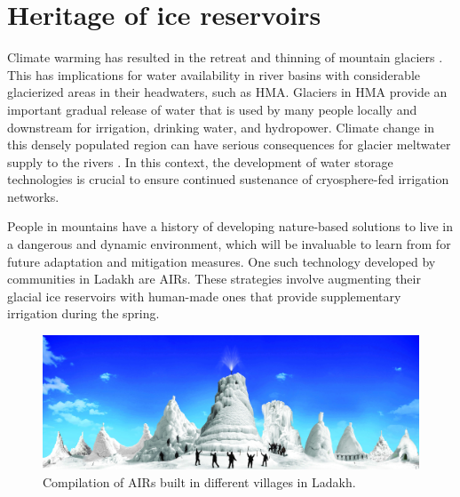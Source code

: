 \chapter{Heritage of ice reservoirs}


Climate warming has resulted in the retreat and thinning of mountain glaciers
\citep{ipccCrossChapterPaperMountains2022}. This has implications for water availability in river basins with considerable glacierized areas in their headwaters, such as \ac{HMA}. Glaciers in \ac{HMA} provide an important
gradual release of water that is used by many people locally and downstream for irrigation, drinking water, and
hydropower. Climate change in this densely populated region can have serious consequences for glacier meltwater
supply to the rivers \citep{immerzeelImportanceVulnerabilityWorld2020}. In this context, the development of
water storage technologies is crucial to ensure continued sustenance of cryosphere-fed irrigation networks.

People in mountains have a history of developing nature-based solutions to live in a dangerous and dynamic
environment, which will be invaluable to learn from for future adaptation and mitigation measures. One such
technology developed by communities in Ladakh are \ac{AIRs}. These strategies involve augmenting their glacial
ice reservoirs with human-made ones that provide supplementary irrigation during the spring.

\begin{figure}[htb]
	\includegraphics[width=\textwidth]{figs/AIRs_Ladakh}
	\caption{Compilation of AIRs built in different villages in Ladakh.}
	\label{fig:airs_ladakh}
\end{figure}

